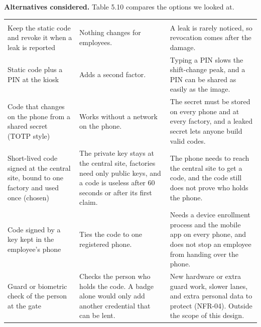 \textbf{Alternatives considered.} Table 5.10 compares the options we looked at.

\begin{longtable}{|>{\raggedright\arraybackslash}p{110pt}|>{\raggedright\arraybackslash}p{140pt}|>{\raggedright\arraybackslash}p{161pt}|}
\hline
\multicolumn{1}{|>{\columncolor{tableheader}\centering\arraybackslash}p{110pt}|}{\textbf{Option}} & \multicolumn{1}{>{\columncolor{tableheader}\centering\arraybackslash}p{140pt}|}{\textbf{Strength}} & \multicolumn{1}{>{\columncolor{tableheader}\centering\arraybackslash}p{161pt}|}{\textbf{Weakness}} \\
\hline
\endhead
\multicolumn{3}{c}{\rule{0pt}{20pt}\normalsize\phantomsection\addcontentsline{lot}{table}{\protect\numberline{5.10}Alternatives for Protecting the QR Credential}\textbf{Table 5.10. Alternatives for Protecting the QR Credential}} \\
\endlastfoot
Keep the static code and revoke it when a leak is reported & Nothing changes for employees. & A leak is rarely noticed, so revocation comes after the damage. \\
\hline
Static code plus a PIN at the kiosk & Adds a second factor. & Typing a PIN slows the shift-change peak, and a PIN can be shared as easily as the image. \\
\hline
Code that changes on the phone from a shared secret (TOTP style) & Works without a network on the phone. & The secret must be stored on every phone and at every factory, and a leaked secret lets anyone build valid codes. \\
\hline
Short-lived code signed at the central site, bound to one factory and used once (chosen) & The private key stays at the central site, factories need only public keys, and a code is useless after 60 seconds or after its first claim. & The phone needs to reach the central site to get a code, and the code still does not prove who holds the phone. \\
\hline
Code signed by a key kept in the employee's phone & Ties the code to one registered phone. & Needs a device enrollment process and the mobile app on every phone, and does not stop an employee from handing over the phone. \\*
\hline\noalign{\nobreak}
Guard or biometric check of the person at the gate & Checks the person who holds the code. A badge alone would only add another credential that can be lent. & New hardware or extra guard work, slower lanes, and extra personal data to protect (NFR-04). Outside the scope of this design. \\
\hline
\end{longtable}

